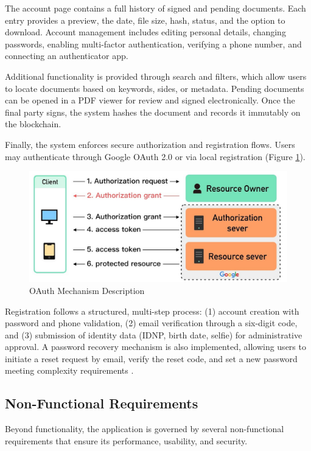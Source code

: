 The account page contains a full history of signed and pending documents. Each entry provides a preview, the date, file size, hash, status, and the option to download. Account management includes editing personal details, changing passwords, enabling multi-factor authentication, verifying a phone number, and connecting an authenticator app.

Additional functionality is provided through search and filters, which allow users to locate documents based on keywords, sides, or metadata. Pending documents can be opened in a PDF viewer for review and signed electronically. Once the final party signs, the system hashes the document and records it immutably on the blockchain.

Finally, the system enforces secure authorization and registration flows. Users may authenticate through Google OAuth 2.0 or via local registration (Figure \ref{oauth-mechanism}). 

\begin{figure}[H]
    \centering
    \includegraphics[width=18cm]{"images/oauth-mechanism.jpg"}
    \caption{OAuth Mechanism Description}
    \label{oauth-mechanism}
\end{figure}

Registration follows a structured, multi-step process: (1) account creation with password and phone validation, (2) email verification through a six-digit code, and (3) submission of identity data (IDNP, birth date, selfie) for administrative approval. A password recovery mechanism is also implemented, allowing users to initiate a reset request by email, verify the reset code, and set a new password meeting complexity requirements .

\subsection{Non-Functional Requirements}
Beyond functionality, the application is governed by several non-functional requirements that ensure its performance, usability, and security.

